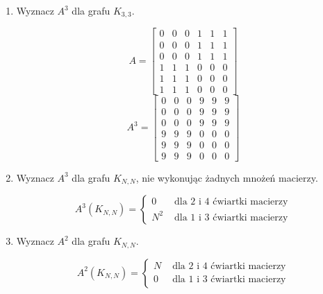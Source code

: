 \documentclass[a4paper,12pt]{article}
\theoremstyle{definition}%
\theoremstyle{definition}
\theoremstyle{problem}
\begin{document}
\begin{enumerate}[label=\alph*)]
\item Wyznacz $A^3$ dla grafu $K_{3,3}$.

$$A=\begin{bmatrix}
0&0&0&1&1&1\\
0&0&0&1&1&1\\
0&0&0&1&1&1\\
1&1&1&0&0&0\\
1&1&1&0&0&0\\
1&1&1&0&0&0
\end{bmatrix}$$
$$A^3=\begin{bmatrix}
0&0&0&9&9&9\\
0&0&0&9&9&9\\
0&0&0&9&9&9\\
9&9&9&0&0&0\\
9&9&9&0&0&0\\
9&9&9&0&0&0
\end{bmatrix}$$
\item Wyznacz $A^3$ dla grafu $K_{N,N}$, nie wykonując żadnych mnożeń macierzy.

$$A^3(K_{N,N})=\left\{\begin{matrix}
0 & \text{ dla }2\text{ i }4 \text{ ćwiartki macierzy}\\
N^2 & \text{ dla }1\text{ i }3 \text{ ćwiartki macierzy}
\end{matrix}\right.$$
\item Wyznacz $A^2$ dla grafu $K_{N,N}$.

$$A^2(K_{N,N})=\left\{\begin{matrix}
N & \text{ dla }2\text{ i }4 \text{ ćwiartki macierzy}\\
0 & \text{ dla }1\text{ i }3 \text{ ćwiartki macierzy}
\end{matrix}\right.$$
\end{enumerate}
\end{document}
